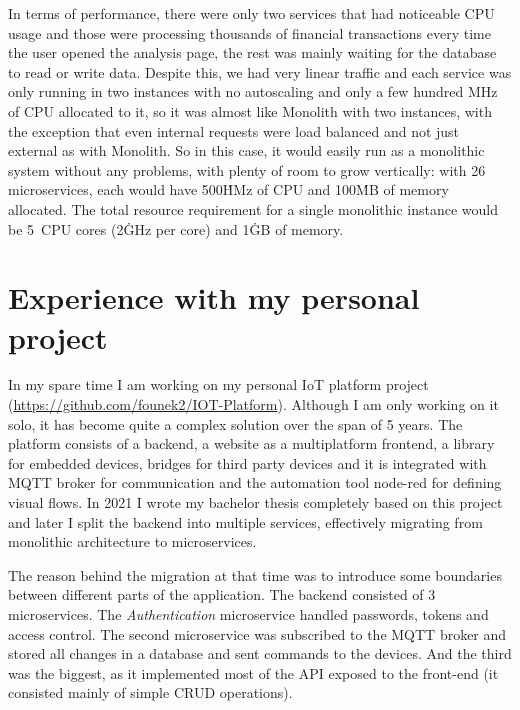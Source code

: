 In terms of performance, there were only two services that had noticeable CPU usage and those were processing thousands of financial transactions every time the user opened the analysis page, the rest was mainly waiting for the database to read or write data. Despite this, we had very linear traffic and each service was only running in two instances with no autoscaling and only a few hundred MHz of CPU allocated to it, so it was almost like Monolith with two instances, with the exception that even internal requests were load balanced and not just external as with Monolith. So in this case, it would easily run as a monolithic system without any problems, with plenty of room to grow vertically: with 26 microservices, each would have 500\.HMz of CPU and 100\.MB of memory allocated. The total resource requirement for a single monolithic instance would be 5~CPU cores (2\.GHz per core) and 1\.GB of memory.


\section{Experience with my personal project}
In my spare time I am working on my personal IoT platform project (\href{https://github.com/founek2/IOT-Platform}{https://github.com/founek2/IOT-Platform}). Although I am only working on it solo, it has become quite a complex solution over the span of 5 years. The platform consists of a backend, a website as a multiplatform frontend, a library for embedded devices, bridges for third party devices and it is integrated with MQTT broker for communication and the automation tool node-red for defining visual flows. In 2021 I wrote my bachelor thesis completely based on this project and later I split the backend into multiple services, effectively migrating from monolithic architecture to microservices.

The reason behind the migration at that time was to introduce some boundaries between different parts of the application. The backend consisted of 3 microservices. The \textit{Authentication} microservice handled passwords, tokens and access control. The second microservice was subscribed to the MQTT broker and stored all changes in a database and sent commands to the devices. And the third was the biggest, as it implemented most of the API exposed to the front-end (it consisted mainly of simple CRUD operations).

